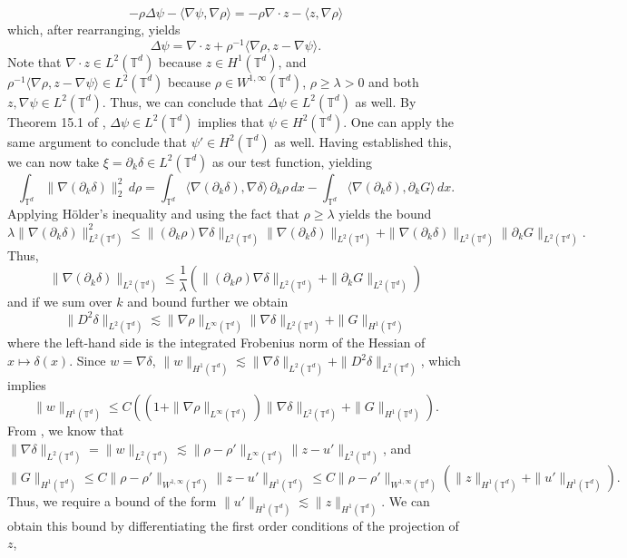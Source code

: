 \documentclass[11pt]{article}
\begin{document}
\[-\rho \Delta\psi - \langle \nabla \psi, \nabla \rho\rangle = - \rho \nabla \cdot z - \langle z, \nabla \rho\rangle\]
which, after rearranging, yields
\[\Delta\psi = \nabla \cdot z + \rho^{-1}\langle \nabla \rho, z - \nabla \psi\rangle.\]
Note that $\nabla \cdot z \in L^2(\mathbb{T}^d)$ because $z \in H^1(\mathbb{T}^d)$, and $\rho^{-1}\langle \nabla \rho, z - \nabla \psi\rangle \in L^2(\mathbb{T}^d)$ because $\rho \in W^{1, \infty}(\mathbb{T}^d)$, $\rho \geq \lambda > 0$ and both $z, \nabla \psi \in L^2(\mathbb{T}^d)$. Thus, we can conclude that $\Delta \psi \in L^2(\mathbb{T}^d)$ as well. By Theorem 15.1 of \citet{dyatlov2022ellipticnotes}, $\Delta \psi \in L^2(\mathbb{T}^d)$
implies that $\psi \in H^2(\mathbb{T}^d)$. One can apply the same argument to conclude that $\psi' \in H^2(\mathbb{T}^d)$ as well. Having established this, we can now take $\xi = \partial_k\delta \in L^2(\mathbb{T}^d)$ as our test function, yielding
\[\int_{\mathbb{T}^d} \|\nabla (\partial_k \delta)\|_2^2 \, d\rho = \int_{\mathbb{T}^d} \langle \nabla (\partial_k\delta), \nabla \delta\rangle \, \partial_k\rho \, dx - \int_{\mathbb{T}^d}\langle \nabla (\partial_k\delta),  \partial_kG\rangle  \, dx.\]
Applying H\"older's inequality and using the fact that $\rho \geq \lambda$ yields the bound
\[\lambda\|\nabla (\partial_k\delta)\|^2_{L^2(\mathbb{T}^d)} \leq \|(\partial_k \rho)\nabla \delta\|_{L^2(\mathbb{T}^d)}\|\nabla (\partial_k\delta)\|_{L^2(\mathbb{T}^d)} + \|\nabla (\partial_k\delta)\|_{L^2(\mathbb{T}^d)}\|\partial_kG\|_{L^2(\mathbb{T}^d)}.\]
Thus,
\[\|\nabla (\partial_k\delta)\|_{L^2(\mathbb{T}^d)} \leq \frac{1}{\lambda}\left(\|(\partial_k \rho)\nabla \delta\|_{L^2(\mathbb{T}^d)} + \|\partial_kG\|_{L^2(\mathbb{T}^d)}\right)\]
and if we sum over $k$ and bound further we obtain
\[\|D^2\delta\|_{L^2(\mathbb{T}^d)} \lesssim  \|\nabla \rho\|_{L^\infty(\mathbb{T}^d)}\|\nabla \delta\|_{L^2(\mathbb{T}^d)} + \|G\|_{H^1(\mathbb{T}^d)}\]
where the left-hand side is the integrated Frobenius norm of the Hessian of $x \mapsto \delta(x)$. Since $w = \nabla \delta$, $\|w\|_{H^1(\mathbb{T}^d)} \lesssim  \|\nabla \delta\|_{L^2(\mathbb{T}^d)} + \|D^2\delta\|_{L^2(\mathbb{T}^d)}$, which implies
\begin{equation}\label{sobolev norm on w intermediate}
\|w\|_{H^1(\mathbb{T}^d)} \leq C\left((1+\|\nabla \rho\|_{L^\infty(\mathbb{T}^d)})\|\nabla \delta\|_{L^2(\mathbb{T}^d)} + \|G\|_{H^1(\mathbb{T}^d)}\right). 
\end{equation}
From , we know that $\|\nabla \delta\|_{L^2(\mathbb{T}^d)} = \|w\|_{L^2(\mathbb{T}^d)} \lesssim  \|\rho - \rho'\|_{L^\infty(\mathbb{T}^d)}\|z - u'\|_{L^2(\mathbb{T}^d)}$, and $\|G\|_{H^1(\mathbb{T}^d)} \leq C\|\rho - \rho'\|_{W^{1, \infty}(\mathbb{T}^d)}\|z - u'\|_{H^1(\mathbb{T}^d)} \leq C\|\rho - \rho'\|_{W^{1, \infty}(\mathbb{T}^d)}(\|z\|_{H^1(\mathbb{T}^d)} + \|u'\|_{H^1(\mathbb{T}^d)}).$ Thus, we require a bound of the form $\|u'\|_{H^1(\mathbb{T}^d)} \lesssim \|z\|_{H^1(\mathbb{T}^d)}.$ We can obtain this bound by differentiating the first order conditions of the projection of $z$,
\end{document}
